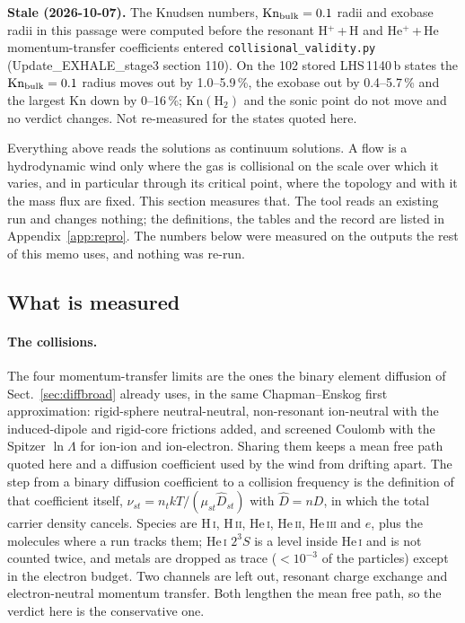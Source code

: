 \documentclass[english,a4paper]{my_memo}
\begin{document}
\noindent\textbf{Stale (2026-10-07).} The Knudsen numbers, $\mathrm{Kn}_{\rm bulk}=0.1$ radii and exobase radii in this passage were computed before the resonant H$^+$\,+\,H and He$^+$\,+\,He momentum-transfer coefficients entered \texttt{collisional\_validity.py} (Update\_EXHALE\_stage3 section 110). On the 102 stored LHS\,1140\,b states the $\mathrm{Kn}_{\rm bulk}=0.1$ radius moves out by 1.0--5.9\,\%, the exobase out by 0.4--5.7\,\% and the largest Kn down by 0--16\,\%; $\mathrm{Kn}(\mathrm{H_2})$ and the sonic point do not move and no verdict changes. Not re-measured for the states quoted here.


Everything above reads the solutions as continuum solutions. A flow is a
hydrodynamic wind only where the gas is collisional on the scale over which
it varies, and in particular through its critical point, where the topology
and with it the mass flux are fixed. This section measures that. The tool
reads an existing run and changes nothing; the definitions, the tables and
the record are listed in Appendix~\ref{app:repro}. The numbers below were
measured on the outputs the rest of this memo uses, and nothing was re-run.

\subsection{What is measured}

\paragraph{The collisions.} The four momentum-transfer limits are the ones
the binary element diffusion of Sect.~\ref{sec:diffbroad} already uses, in
the same Chapman--Enskog first approximation: rigid-sphere neutral-neutral,
non-resonant ion-neutral with the induced-dipole and rigid-core frictions
added, and screened Coulomb with the Spitzer $\ln\Lambda$ for ion-ion and
ion-electron. Sharing them keeps a mean free path quoted here and a diffusion
coefficient used by the wind from drifting apart. The step from a binary
diffusion coefficient to a collision frequency is the definition of that
coefficient itself, $\nu_{st} = n_t k T/(\mu_{st}\hat D_{st})$ with
$\hat D = n D$, in which the total carrier density cancels. Species are
H\,\textsc{i}, H\,\textsc{ii}, He\,\textsc{i}, He\,\textsc{ii},
He\,\textsc{iii} and $e$, plus the molecules where a run tracks them;
He\,\textsc{i} $2^3S$ is a level inside He\,\textsc{i} and is not counted
twice, and metals are dropped as trace ($<10^{-3}$ of the particles) except
in the electron budget. Two channels are left out, resonant charge exchange
and electron-neutral momentum transfer. Both lengthen the mean free path, so
the verdict here is the conservative one.
\end{document}
